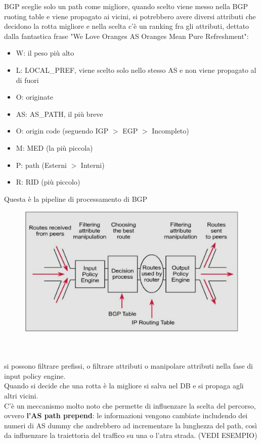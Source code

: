 \documentclass[12pt, oneside]{extbook} %
\begin{document}
BGP sceglie solo un path come migliore, quando scelto viene messo nella BGP ruoting table e viene propagato ai vicini, si potrebbero avere diversi attributi che decidono la rotta migliore e nella scelta c'è un ranking fra gli attributi, dettato dalla fantastica frase "We Love Oranges AS Oranges Mean Pure Refreshment":
\begin{itemize}
    \item W: il peso più alto
    \item L: LOCAL\_PREF, viene scelto solo nello stesso AS e non viene propagato al di fuori
    \item O: originate
    \item AS: AS\_PATH, il più breve
    \item O: origin code (seguendo IGP $>$ EGP $>$ Incompleto)
    \item M: MED (la più piccola)
    \item P: path (Esterni $>$ Interni)
    \item R: RID (più piccolo)
\end{itemize}
Questa è la pipeline di processamento di BGP\\
\begin{figure}[h!]
    \centering
    \includegraphics[scale=0.5]{../../immagini/bgp_pipe}
\end{figure}\\\\
si possono filtrare prefissi, o filtrare attributi o manipolare attributi nella fase di input policy engine.
\\Quando si decide che una rotta è la migliore si salva nel DB e si propaga agli altri vicini.
\\C'è un meccanismo molto noto che permette di influenzare la scelta del percorso, ovvero \textbf{l'AS path prepend}: le informazioni vengono cambiate includendo dei numeri di AS dummy che andrebbero ad incrementare la lunghezza del path, così da influenzare la traiettoria del traffico su una o l'atra strada. (VEDI ESEMPIO)
\end{document}
